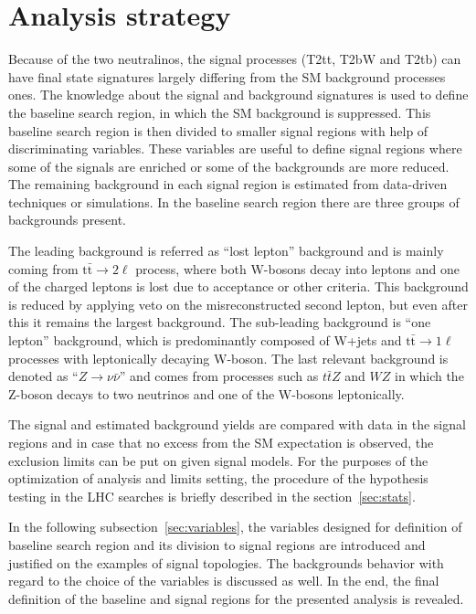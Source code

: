 \section{Analysis strategy}

Because of the two neutralinos, the signal processes (T2tt, T2bW and T2tb)  can have final state signatures largely differing from the SM background processes ones. The knowledge about the signal and background signatures is used to define the baseline search region, in which the SM background is suppressed. This baseline search region is then divided to smaller signal regions with help of discriminating variables. These variables are useful to define signal regions where some of the signals are enriched or some of the backgrounds are more reduced. The remaining background in each signal region is estimated from data-driven techniques or simulations. In the baseline search region there are three groups of backgrounds present. 

The leading background is referred as ``lost lepton'' background and is mainly coming from $\mathrm{t\bar{t}} \to 2 \ell$ process, where both W-bosons decay into leptons and one of the charged leptons is lost due to acceptance or other criteria. This background is reduced by applying veto on the misreconstructed second lepton, but even after this it remains the largest background. The sub-leading background is ``one lepton'' background, which is predominantly composed of W+jets and $\mathrm{t\bar{t}} \to 1 \ell$ processes with leptonically decaying W-boson. The last relevant background is denoted as ``$Z \to \nu \bar{\nu}$'' and comes from processes such as $t\bar{t}Z$ and $WZ$ in which the Z-boson decays to two neutrinos and one of the W-bosons leptonically.  

The signal and estimated background yields are compared with data in the signal regions and in case that no excess from the SM expectation is observed, the exclusion limits can be put on given signal models. For the purposes of the optimization of analysis and limits setting, the procedure of the hypothesis testing in the LHC searches is briefly described in the section~\ref{sec:stats}. 

In the following subsection~\ref{sec:variables}, the variables designed for definition of baseline search region and its division to signal regions are introduced and justified on the examples of signal topologies. The backgrounds behavior with regard to the choice of the variables is discussed as well. In the end, the final definition of the baseline and signal regions for the presented analysis is revealed.

